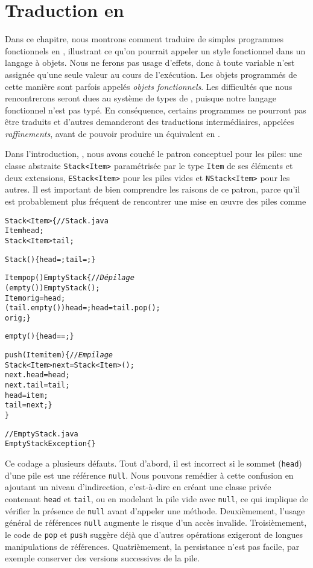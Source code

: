 \chapter{Traduction en \Java}

Dans ce chapitre, nous montrons comment traduire de simples programmes
fonctionnels en \Java, illustrant ce qu'on pourrait appeler un style
fonctionnel dans un langage à objets. Nous ne ferons pas usage
d'effets, donc à toute variable n'est assignée qu'une seule valeur au
cours de l'exécution. Les objets programmés de cette manière sont
parfois appelés \emph{objets fonctionnels}. Les difficultés que nous
rencontrerons seront dues au système de types de \Java, puisque notre
langage fonctionnel n'est pas typé. En conséquence, certains
programmes ne pourront pas être traduits et d'autres demanderont des
traductions intermédiaires, appelées \emph{raffinements}, avant de
pouvoir produire un équivalent en \Java.

Dans l'introduction, , nous avons couché le patron
conceptuel pour les piles: une classe abstraite \texttt{Stack<Item>}
paramétrisée par le type \texttt{Item} de ses éléments et deux
extensions, \texttt{EStack<Item>} pour les piles vides et
\texttt{NStack<Item>} pour les autres. Il est important de bien
comprendre les raisons de ce patron, parce qu'il est probablement plus
fréquent de rencontrer une mise en {\oe}uvre des piles comme
\begin{alltt}
\public \class Stack<Item> \{\hfill// Stack.java
  \private Item head;
  \private Stack<Item> tail;

  \public Stack() \{ head = \nullX; tail = \nullX; \}

  \public Item pop() \throws EmptyStack \{\hfill// \emph{Dépilage}
    \ifX (empty()) \throw \new EmptyStack();
    \final Item orig = head;
    \ifX (tail.empty()) head = \nullX; \elseX head = tail.pop();
    \return orig; \}

  \public \booleanX empty() \{ \return head == \nullX; \}

  \public \void push(\final Item item) \{\hfill// \emph{Empilage}
    Stack<Item> next = \new Stack<Item>();
    next.head = head;
    next.tail = tail;
    head = item;
    tail = next; \}
\}

// EmptyStack.java
\public \class EmptyStack \extends Exception \{\} 
\end{alltt}
Ce codage a plusieurs défauts. Tout d'abord, il est incorrect si le
sommet (\texttt{head}) d'une pile est une référence
\texttt{null}. Nous pouvons remédier à cette confusion en ajoutant un
niveau d'indirection, c'est-à-dire en créant une classe privée
contenant \texttt{head} et \texttt{tail}, ou en modelant la pile vide
avec \texttt{null}, ce qui implique de vérifier la présence de
\texttt{null} avant d'appeler une méthode. Deuxièmement, l'usage
général de références \texttt{null} augmente le risque d'un accès
invalide. Troisièmement, le code de \texttt{pop} et \texttt{push}
suggère déjà que d'autres opérations exigeront de longues
manipulations de références. Quatrièmement, la persistance n'est pas
facile, par exemple conserver des versions successives de la pile.

